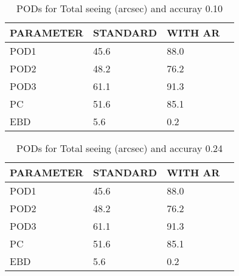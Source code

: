 \documentclass[11pt,english]{article}
\begin{document}
\begin{table}[]
\begin{center}
\begin{tabular}{|l|l|l|l|}
\hline
\multicolumn{1}{|c|}{\cellcolor[HTML]{C0C0C0}\textbf{PARAMETER}} & \multicolumn{1}{c|}{\cellcolor[HTML]{C0C0C0}\textbf{STANDARD}} & \multicolumn{1}{c|}{\cellcolor[HTML]{C0C0C0}\textbf{WITH AR}} \\
\hline
\cellcolor[HTML]{C0C0C0}POD1  & 45.6                                & 88.0         \\
\cellcolor[HTML]{C0C0C0}POD2  & 48.2                                & 76.2         \\
\cellcolor[HTML]{C0C0C0}POD3  & 61.1                                & 91.3         \\
\cellcolor[HTML]{C0C0C0}PC    & 51.6                                  & 85.1           \\
\cellcolor[HTML]{C0C0C0}EBD   & 5.6                                 & 0.2          \\
\hline
\end{tabular}
\caption{PODs for Total seeing (arcsec) and accuray 0.10}
\end{center}
\end{table}
\begin{table}[]
\begin{center}
\begin{tabular}{|l|l|l|l|}
\hline
\multicolumn{1}{|c|}{\cellcolor[HTML]{C0C0C0}\textbf{PARAMETER}} & \multicolumn{1}{c|}{\cellcolor[HTML]{C0C0C0}\textbf{STANDARD}} & \multicolumn{1}{c|}{\cellcolor[HTML]{C0C0C0}\textbf{WITH AR}} \\
\hline
\cellcolor[HTML]{C0C0C0}POD1  & 45.6                                & 88.0         \\
\cellcolor[HTML]{C0C0C0}POD2  & 48.2                                & 76.2         \\
\cellcolor[HTML]{C0C0C0}POD3  & 61.1                                & 91.3         \\
\cellcolor[HTML]{C0C0C0}PC    & 51.6                                  & 85.1           \\
\cellcolor[HTML]{C0C0C0}EBD   & 5.6                                 & 0.2          \\
\hline
\end{tabular}
\caption{PODs for Total seeing (arcsec) and accuray 0.24}
\end{center}
\end{table}
\end{document}
